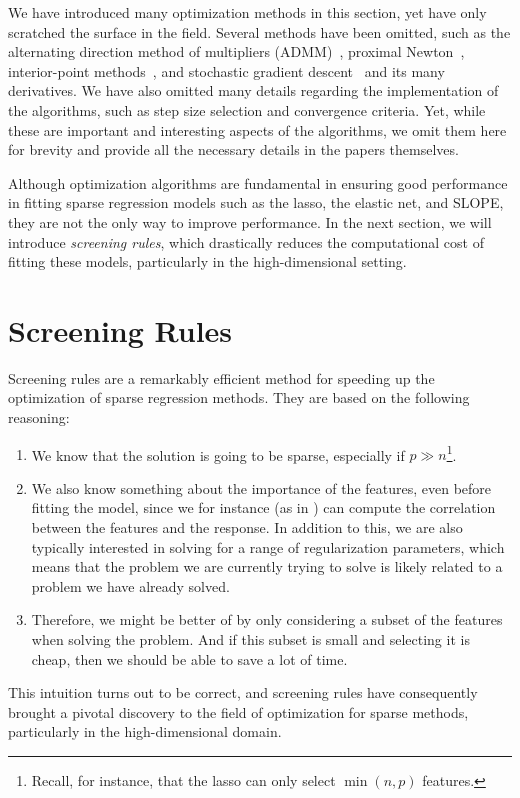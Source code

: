 We have introduced many optimization methods in this section, yet have only scratched the surface in the field. Several methods have been omitted, such as the alternating direction method of multipliers (ADMM)~\parencite{boyd2010}, proximal Newton~\parencite{lee2014}, interior-point methods~\parencite{kim2007}, and stochastic gradient descent~\parencite{robbins1951,bottou2010} and its many derivatives. We have also omitted many details regarding the implementation of the algorithms, such as step size selection and convergence criteria. Yet, while these are important and interesting aspects of the algorithms, we omit them here for brevity and provide all the necessary details in the papers themselves.

Although optimization algorithms are fundamental in ensuring good performance in fitting sparse regression models such as the lasso, the elastic net, and SLOPE, they are not the only way to improve performance. In the next section, we will introduce \emph{screening rules}, which drastically reduces the computational cost of fitting these models, particularly in the high-dimensional setting.

\section{Screening Rules}\label{sec:screening-rules}

Screening rules are a remarkably efficient method for speeding up the optimization of sparse regression methods. They are based on the following reasoning:
\begin{enumerate}
  \item We know that the solution is going to be sparse, especially if \(p \gg n\)\footnote{Recall, for instance, that the lasso can only select \(\min(n, p)\) features.}.
  \item We also know something about the importance of the features, even before fitting the model, since we for instance (as in ) can compute the correlation between the features and the response. In addition to this, we are also typically interested in solving for a range of regularization parameters, which means that the problem we are currently trying to solve is likely related to a problem we have already solved.
  \item Therefore, we might be better of by only considering a subset of the features when solving the problem. And if this subset is small and selecting it is cheap, then we should be able to save a lot of time.
\end{enumerate}
This intuition turns out to be correct, and screening rules have consequently brought a pivotal discovery to the field of optimization for sparse methods, particularly in the high-dimensional domain.

